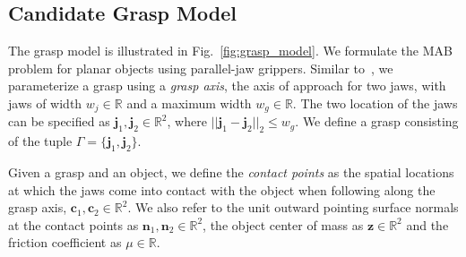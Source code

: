\documentclass[10pt, conference]{ieeeconf}      %
\newcommand{\bc}{\mathbf{c}}
\newcommand{\bn}{\mathbf{n}}
\newcommand{\bz}{\mathbf{z}}
\begin{document}
\subsection{Candidate Grasp Model}
The grasp model is illustrated in Fig.~\ref{fig:grasp_model}. We formulate the MAB problem for planar objects using parallel-jaw grippers. Similar to~\cite{mahler2015gp}, we parameterize a grasp using a {\it grasp axis}, the axis of approach for two jaws,  with jaws of width $w_j \in \mathbb{R}$ and a maximum width $w_g \in \mathbb{R}$. The two location of the jaws can be specified as $\mathbf{j}_1,\mathbf{j}_2 \in \mathbb{R}^2$, where $||\mathbf{j}_1 - \mathbf{j}_2||_2 \leq w_g$. We define a grasp consisting of the tuple $\Gamma = \lbrace \mathbf{j}_1, \mathbf{j}_2 \rbrace$. 


Given a grasp and an object, we define the {\it contact points} as the spatial locations at which the jaws come into contact with the object when following along the grasp axis, $\bc_1, \bc_2 \in \mathbb{R}^2$.
We also refer to the unit outward pointing surface normals at the contact points as $\bn_1, \bn_2 \in \mathbb{R}^2$, the object center of mass as $\bz \in \mathbb{R}^2$ and the friction coefficient as $\mu \in \mathbb{R}$.

\end{document}
